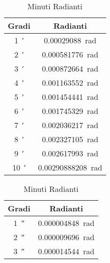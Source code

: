 \begin{table}
\begin{subtable}[b]{.3\linewidth}
	\end{subtable}
	\begin{subtable}[b]{.3\linewidth}
	\centering
\begin{tabular}{cc}
	\toprule
	Gradi & Radianti \\
	\midrule
	\SI{1}{\arcminute}	&\SI[round-precision=\extralungarrotandamento,round-mode=places]{0.00029088}{\radian}  \\ 
	\SI{2}{\arcminute}&\SI[round-precision=\extralungarrotandamento,round-mode=places]{0.000581776}{\radian}  \\ 
	\SI{3}{\arcminute}&\SI[round-precision=\extralungarrotandamento,round-mode=places]{0.000872664}{\radian}  \\ 
	\SI{4}{\arcminute}&\SI[round-precision=\extralungarrotandamento,round-mode=places]{0.001163552}{\radian}  \\ 
	\SI{5}{\arcminute}&\SI[round-precision=\extralungarrotandamento,round-mode=places]{0.001454441}{\radian}  \\ 
	\SI{6}{\arcminute}&\SI[round-precision=\extralungarrotandamento,round-mode=places]{0.001745329}{\radian}  \\ 
	\SI{7}{\arcminute}&\SI[round-precision=\extralungarrotandamento,round-mode=places]{0.002036217}{\radian}  \\ 
	\SI{8}{\arcminute}&\SI[round-precision=\extralungarrotandamento,round-mode=places]{0.002327105}{\radian}  \\ 
	\SI{9}{\arcminute}&\SI[round-precision=\extralungarrotandamento,round-mode=places]{0.002617993}{\radian}  \\  
	\SI{10}{\arcminute}&\SI[round-precision=\extralungarrotandamento,round-mode=places]{0.00290888208}{\radian}  \\  
	\bottomrule
\end{tabular}
	\caption{Minuti Radianti}
\end{subtable}
	\begin{subtable}[b]{.3\linewidth}
	\centering
\begin{tabular}{cc}
	\toprule
	Gradi & Radianti \\
	\midrule
	\SI{1}{\arcsecond}	&\SI[round-precision=\extralungarrotandamento,round-mode=places]{0.000004848}{\radian}  \\ 
	\SI{2}{\arcsecond}&\SI[round-precision=\extralungarrotandamento,round-mode=places]{0.000009696}{\radian}  \\ 
	\SI{3}{\arcsecond}&\SI[round-precision=\extralungarrotandamento,round-mode=places]{0.000014544}{\radian}  \\ 

\end{tabular}
\end{subtable}
\end{table}
